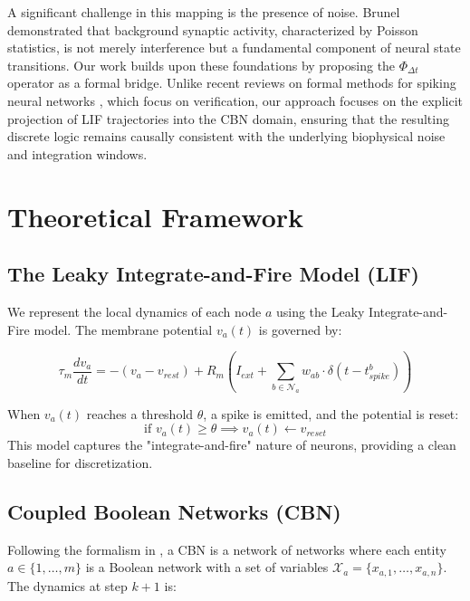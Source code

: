 \documentclass[10pt, conference]{IEEEtran}
\begin{document}
A significant challenge in this mapping is the presence of noise. Brunel \cite{brunel2000dynamics} demonstrated that background synaptic activity, characterized by Poisson statistics, is not merely interference but a fundamental component of neural state transitions. Our work builds upon these foundations by proposing the $\Phi_{\Delta t}$ operator as a formal bridge. Unlike recent reviews on formal methods for spiking neural networks \cite{cui2020review}, which focus on verification, our approach focuses on the explicit projection of LIF trajectories into the CBN domain, ensuring that the resulting discrete logic remains causally consistent with the underlying biophysical noise and integration windows.

\section{Theoretical Framework}

\subsection{The Leaky Integrate-and-Fire Model (LIF)}

We represent the local dynamics of each node $a$ using the Leaky Integrate-and-Fire model. The membrane potential $v_a(t)$ is governed by:

\begin{equation}
    \tau_m \frac{dv_a}{dt} = -(v_a - v_{rest}) + R_m \left( I_{ext} + \sum_{b \in \mathcal{N}_a} w_{ab} \cdot \delta(t - t_{spike}^b) \right)
\end{equation}

When $v_a(t)$ reaches a threshold $\theta$, a spike is emitted, and the potential is reset:
\begin{equation}
    \text{if } v_a(t) \geq \theta \implies v_a(t) \leftarrow v_{reset}
\end{equation}
This model captures the "integrate-and-fire" nature of neurons, providing a clean baseline for discretization.


\subsection{Coupled Boolean Networks (CBN)}

Following the formalism in \cite{tovar2022method}, a CBN is a network of networks where each entity $a \in \{1, \dots, m\}$ is a Boolean network with a set of variables $\mathcal{X}_a = \{x_{a,1}, \dots, x_{a,n}\}$. The dynamics at step $k+1$ is:
\end{document}
